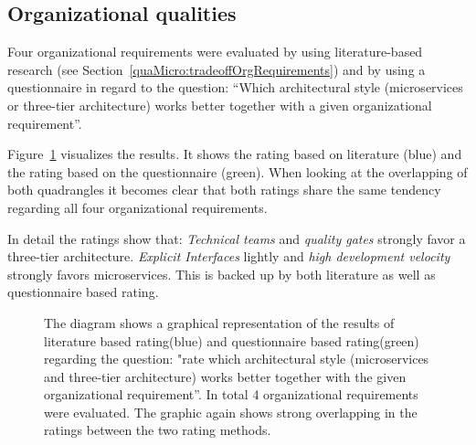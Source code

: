 \subsection{Organizational qualities}

Four organizational requirements were evaluated by using literature-based research (see Section~\ref{quaMicro:tradeoffOrgRequirements}) and by using a questionnaire in regard to the question: ``Which architectural style (microservices or three-tier architecture) works better together with a given organizational requirement''.

Figure~\ref{fig:kiviatOrganizational} visualizes the results.
It shows the rating based on literature (blue) and the rating based on the questionnaire (green).
When looking at the overlapping of both quadrangles it becomes clear that both ratings share the same tendency regarding all four organizational requirements.

In detail the ratings show that:
\textit{Technical teams} and \textit{quality gates} strongly favor a three-tier architecture.
\textit{Explicit Interfaces} lightly and \textit{high development velocity} strongly favors microservices.
This is backed up by both literature as well as questionnaire based rating.

\begin{figure}
\centering
{}
 \caption[KivatDiagram showing a graphical representation between literature and interview based evaluation regarding microservices and organizational requirements]{The diagram shows a graphical representation of the results of literature based rating(blue) and questionnaire based rating(green) regarding the question: "rate which architectural style (microservices and three-tier architecture) works better together with the given organizational requirement''. In total 4 organizational requirements were evaluated. The graphic again shows strong overlapping in the ratings between the two rating methods.}
\label{fig:kiviatOrganizational}
\end{figure}

